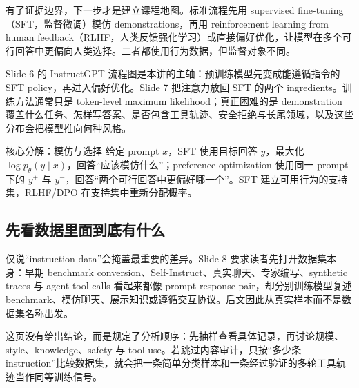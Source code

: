 有了证据边界，下一步才是建立课程地图。标准流程先用 supervised fine-tuning（SFT，监督微调）模仿 demonstrations，再用 reinforcement learning from human feedback（RLHF，人类反馈强化学习）或直接偏好优化，让模型在多个可行回答中更偏向人类选择。二者都使用行为数据，但监督对象不同。


Slide 6 的 InstructGPT 流程图是本讲的主轴：预训练模型先变成能遵循指令的 SFT policy，再进入偏好优化。Slide 7 把注意力放回 SFT 的两个 ingredients。训练方法通常只是 token-level maximum likelihood；真正困难的是 demonstration 覆盖什么任务、怎样写答案、是否包含工具轨迹、安全拒绝与长尾领域，以及这些分布会把模型推向何种风格。

\begin{importantbox}{核心分解：模仿与选择}
给定 prompt $x$，SFT 使用目标回答 $y$，最大化 $\log p_\theta(y\mid x)$，回答“应该模仿什么”；preference optimization 使用同一 prompt 下的 $y^+$ 与 $y^-$，回答“两个可行回答中更偏好哪一个”。SFT 建立可用行为的支持集，RLHF/DPO 在支持集中重新分配概率。
\end{importantbox}

\subsection{先看数据里面到底有什么}

仅说“instruction data”会掩盖最重要的差异。Slide 8 要求读者先打开数据集本身：早期 benchmark conversion、Self-Instruct、真实聊天、专家编写、synthetic traces 与 agent tool calls 看起来都像 prompt-response pair，却分别训练模型复述 benchmark、模仿聊天、展示知识或遵循交互协议。后文因此从真实样本而不是数据集名称出发。


这页没有给出结论，而是规定了分析顺序：先抽样查看具体记录，再讨论规模、style、knowledge、safety 与 tool use。若跳过内容审计，只按“多少条 instruction”比较数据集，就会把一条简单分类样本和一条经过验证的多轮工具轨迹当作同等训练信号。

